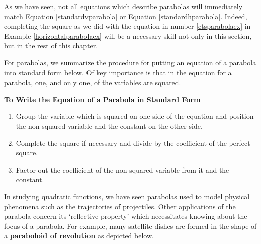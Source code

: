 As we have seen, not all equations which describe parabolas will immediately match Equation \ref{standardvparabola} or Equation \ref{standardhparabola}.  Indeed, completing the square as we did with the equation in number \ref{ctsparabolaex} in Example \ref{horizontalparabolaex}  will be a necessary skill not only in this section, but in the rest of this chapter. 

\smallskip

 For parabolas, we summarize the procedure for putting an equation of a parabola into standard form below.  Of key importance is that in the equation for a parabola, one, and only one, of the variables are squared.

\smallskip

\colorbox{ResultColor}{\bbm

\centerline{\textbf{To Write the Equation of a Parabola in Standard Form}}

\begin{enumerate}

\item  Group the variable which is squared on one side of the equation and position the non-squared variable and the constant on the other side.

\item  Complete the square if necessary and divide by the coefficient of the perfect square.

\item  Factor out the coefficient of the non-squared variable from it and the constant.

\end{enumerate}

\ebm}

\smallskip

\label{paraboloid}
In studying quadratic functions, we have seen parabolas used to model physical phenomena such as the trajectories of projectiles.  Other applications of the parabola concern its `reflective property' which necessitates knowing about the focus of a parabola.  For example, many satellite dishes are formed in the shape of a  \textbf{paraboloid of revolution} as depicted below.

